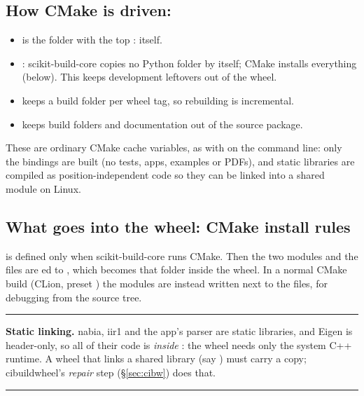 \documentclass[11pt,a4paper]{article}
\newcommand{\filepiece}[3]{}
\newenvironment{note}[1]{\par\medskip\noindent\rule{\linewidth}{0.4pt}\par\nopagebreak\noindent
  \textbf{#1}\enspace}{\par\nopagebreak\noindent\rule{\linewidth}{0.4pt}\par\medskip}
\begin{document}
\subsection{How CMake is driven: \texorpdfstring{}{[tool.scikit-build]}}
\filepiece{pyproject-tool-scikit-build}{toml}{\code{cpp/pyproject.toml}: scikit-build-core settings}
\begin{itemize}
  \item {} is the folder with the top :  itself.
  \item {}: scikit-build-core copies no Python folder by itself; CMake
        installs everything (below). This keeps development leftovers out of the wheel.
  \item {} keeps a build folder per wheel tag, so rebuilding is incremental.
  \item {} keeps build folders and documentation out of the source package.
\end{itemize}
\filepiece{pyproject-tool-scikit-build-cmake-define}{toml}{\code{cpp/pyproject.toml}: CMake options for wheel builds}
These are ordinary CMake cache variables, as with  on the command line: only the bindings
are built (no tests, apps, examples or PDFs), and static libraries are compiled as
position-independent code so they can be linked into a shared module on Linux.

\subsection{What goes into the wheel: CMake install rules}
\filepiece{bindings-cmake}{cmake}{\code{cpp/bindings/CMakeLists.txt}: the modules and the install rules}
 is defined only when scikit-build-core runs CMake. Then the two modules and the
 files are ed to , which becomes that folder
inside the wheel. In a normal CMake build (CLion, preset ) the modules are
instead written next to the  files, for debugging from the source tree.

\begin{note}{Static linking.}
nabia, iir1 and the app's parser are static libraries, and Eigen is header-only, so all of their
code is \emph{inside} : the wheel needs only the system C++ runtime. A wheel that links
a shared library (say ) must carry a copy; cibuildwheel's \emph{repair} step
(\S\ref{sec:cibw}) does that.
\end{note}
\end{document}
